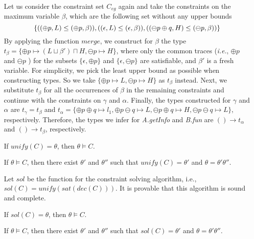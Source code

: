 {{{Let us consider the constraint set $C_{eg}$ again and take the constraints on the maximum variable $\beta$, which are the following set without any upper bounds
{\myeqsize
$$
\{((\oplus p,L)\leq(\oplus p,\beta)),
((\epsilon,L)\leq(\epsilon,\beta)),
((\ominus p\oplus q,H)\leq(\ominus p,\beta))\}
$$
}
By applying the function $merge$, we construct for $\beta$ the type $t_{\beta} = \{\oplus p \mapsto (L\sqcup \beta')\sqcap H, \ominus p \mapsto H\}$,  where only the common traces (\emph{i.e.}, $\oplus p$ and $\ominus p$ ) for the subsets $\{\epsilon, \oplus p\}$ and $\{\epsilon, \ominus p\} $ are satisfiable, and $\beta'$ is a fresh variable.
For simplicity, we pick the least upper bound as possible when constructing types.
So we take $\{\oplus p \mapsto L, \ominus p \mapsto H\}$ as $t_{\beta}$ instead.
Next, we substitute $t_{\beta}$ for all the occurrences of $\beta$ in the remaining constraints and continue with the constraints on $\gamma$ and $\alpha$.
Finally, the types constructed for $\gamma$ and $\alpha$ are $t_{\gamma} = t_{\beta}$ and $t_{\alpha} = \{\oplus p\oplus q \mapsto l_1, \oplus p\ominus q\mapsto L, \ominus p\oplus q \mapsto H, \ominus p\ominus q \mapsto L\}$, respectively.
Therefore, the types we infer for \textit{A.getInfo} and \textit{B.fun} are $()\rightarrow t_{\alpha}$ and $()\rightarrow t_{\beta}$, respectively.


\begin{lemma}\label{lem:unifysound}
If $unify(C) = \theta$, then $\theta \vDash C$.
\end{lemma}

\begin{lemma}\label{lem:unifycomplete}
If $\theta \vDash C$, then there exist $\theta'$ and $\theta''$ such that $unify(C) = \theta'$ and $\theta = \theta'\theta''$.
\end{lemma}


Let $sol$ be the function for the constraint solving algorithm, i.e., $sol(C) = unify(sat(dec(C)))$.
It is provable that this algorithm is sound and complete.

\begin{lemma}\label{lem:solsound}
If $sol(C) = \theta$, then $\theta \vDash C$.
\end{lemma}

\begin{lemma}\label{lem:solcomplete}
If $\theta \vDash C$, then there exist $\theta'$ and $\theta''$ such that $sol(C) = \theta'$ and $\theta = \theta'\theta''$.
\end{lemma}


}}}

